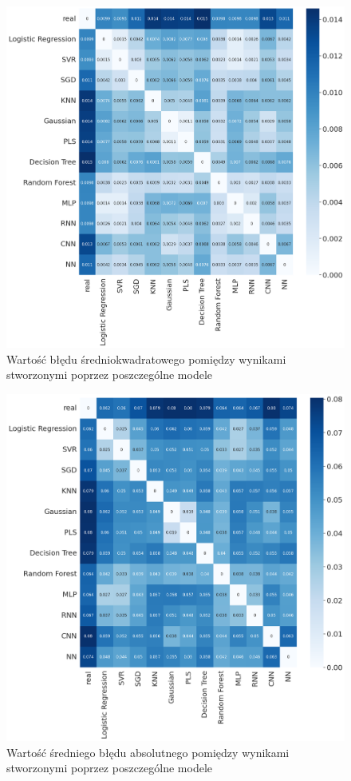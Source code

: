 \begin{figure}[H]
    \centering
    \includegraphics[width=\textwidth]{images/mse_matrix2.png}
    \caption[Błąd średniokwadratowy ze względu na model]{Wartość błędu średniokwadratowego pomiędzy wynikami stworzonymi poprzez poszczególne modele}
    \label{mse-matrix}
\end{figure}

\begin{figure}[H]
    \centering
    \includegraphics[width=\textwidth]{images/mae_matrix2.png}
    \caption[Średni błąd absolutny ze względu na model]{Wartość średniego błędu absolutnego pomiędzy wynikami stworzonymi poprzez poszczególne modele}
    \label{mae-matrix}
\end{figure}

